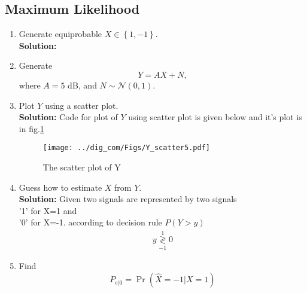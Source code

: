 \documentclass{article}
\numberwithin{equation}{subsection}
\numberwithin{figure}{subsection}
\providecommand{\cbrak}[1]{\ensuremath{\left\{#1\right\}}}
\providecommand{\pr}[1]{\ensuremath{\Pr\left(#1\right)}}
\providecommand{\dec}[2]{\ensuremath{\overset{#1}{\underset{#2}{\gtrless}}}}
\providecommand{\gauss}[2]{\mathcal{N}\ensuremath{\left(#1,#2\right)}}
\newcommand{\solution}{\noindent \textbf{Solution: }}
\renewcommand\thesection{\arabic{section}}
\renewcommand\thesubsection{\thesection.\arabic{subsection}}
\begin{document}
\subsection{Maximum Likelihood}
\begin{enumerate}[label=\thesubsection.\arabic*,ref=\thesubsection.\arabic{figure}]
\item Generate equiprobable $X \in \cbrak{1,-1}$.\\
\solution
\begin{center}
\end{center}
%
\item Generate 
\begin{equation}
Y = AX+N,
\end{equation}
		where $A = 5$ dB,  and $N \sim \gauss{0}{1}$.
\begin{center}
\end{center}		
\item Plot $Y$ using a scatter plot.\\
\solution
Code for plot of $Y$ using scatter plot is given below and it's plot is in fig.\ref{fig:scatter1} 
\begin{figure}
\centering
\texttt{[image: ../dig\_com/Figs/Y\_scatter5.pdf]}  
\caption{The scatter plot of Y}
\label{fig:scatter1}
\end{figure}
\begin{center}
\end{center}
	\item Guess how to estimate $X$ from $Y$.\\
	\solution 
	Given two signals are represented by two signals\\
	'1' for X=1 and\\
	'0' for X=-1.
	according to decision rule $P(Y > y)$
	\begin{align}
        y \dec{1}{-1} 0 \label{eq:decision1}
        \end{align}
\item
\label{ml-ch4_sim}
Find 
\begin{equation}
	P_{e|0} = \pr{\hat{X} = -1|X=1}

\end{equation}
\end{enumerate}
\end{document}
